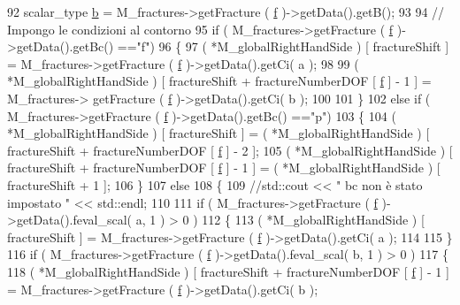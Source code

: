 \begin{DoxyCode}
92         scalar\_type \hyperlink{init_8m_a21ad0bd836b90d08f4cf640b4c298e7c}{b} = M\_fractures->getFracture ( \hyperlink{god__e_8m_a68f477f9b30a6300d5af9b02eac82f35}{f} )->getData().getB();
93 
94         \textcolor{comment}{// Impongo le condizioni al contorno}
95         \textcolor{keywordflow}{if} ( M\_fractures->getFracture ( \hyperlink{god__e_8m_a68f477f9b30a6300d5af9b02eac82f35}{f} )->getData().getBc() ==\textcolor{stringliteral}{"f"})
96         \{
97             ( *M\_globalRightHandSide ) [ fractureShift ]  = M\_fractures->getFracture ( 
      \hyperlink{god__e_8m_a68f477f9b30a6300d5af9b02eac82f35}{f} )->getData().getCi( a );
98 
99             ( *M\_globalRightHandSide ) [ fractureShift + fractureNumberDOF [ \hyperlink{god__e_8m_a68f477f9b30a6300d5af9b02eac82f35}{f} ] - 1 ] = M\_fractures->
      getFracture ( \hyperlink{god__e_8m_a68f477f9b30a6300d5af9b02eac82f35}{f} )->getData().getCi( b );
100 
101         \}
102         \textcolor{keywordflow}{else} \textcolor{keywordflow}{if} ( M\_fractures->getFracture ( \hyperlink{god__e_8m_a68f477f9b30a6300d5af9b02eac82f35}{f} )->getData().getBc() ==\textcolor{stringliteral}{"p"})
103         \{
104             ( *M\_globalRightHandSide ) [ fractureShift ]  = ( *M\_globalRightHandSide ) [ fractureShift + 
      fractureNumberDOF [ \hyperlink{god__e_8m_a68f477f9b30a6300d5af9b02eac82f35}{f} ] - 2 ];
105             ( *M\_globalRightHandSide ) [ fractureShift + fractureNumberDOF [ \hyperlink{god__e_8m_a68f477f9b30a6300d5af9b02eac82f35}{f} ] - 1 ]  = (
       *M\_globalRightHandSide ) [ fractureShift + 1 ];
106         \}
107         \textcolor{keywordflow}{else}
108         \{
109             \textcolor{comment}{//std::cout << " bc non è stato impostato " << std::endl;}
110 
111             \textcolor{keywordflow}{if} ( M\_fractures->getFracture ( \hyperlink{god__e_8m_a68f477f9b30a6300d5af9b02eac82f35}{f} )->getData().feval\_scal( a, 1 ) > 0 )
112             \{
113                 ( *M\_globalRightHandSide ) [ fractureShift ]  = M\_fractures->getFracture ( 
      \hyperlink{god__e_8m_a68f477f9b30a6300d5af9b02eac82f35}{f} )->getData().getCi( a );
114 
115             \}
116             \textcolor{keywordflow}{if} ( M\_fractures->getFracture ( \hyperlink{god__e_8m_a68f477f9b30a6300d5af9b02eac82f35}{f} )->getData().feval\_scal( b, 1 ) > 0 )
117             \{
118                 ( *M\_globalRightHandSide ) [ fractureShift + fractureNumberDOF [ 
      \hyperlink{god__e_8m_a68f477f9b30a6300d5af9b02eac82f35}{f} ] - 1 ]  = M\_fractures->getFracture ( \hyperlink{god__e_8m_a68f477f9b30a6300d5af9b02eac82f35}{f} )->getData().getCi( b );

\end{DoxyCode}

